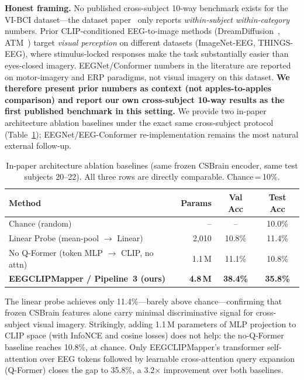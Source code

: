 \documentclass{article}
\begin{document}
\textbf{Honest framing.} No published cross-subject 10-way benchmark exists for the VI-BCI dataset---the dataset paper~\citep{figshare_paper} only reports \emph{within-subject within-category} numbers. Prior CLIP-conditioned EEG-to-image methods (DreamDiffusion~\citep{bai2023dreamdiffusion}, ATM~\citep{li2024atm}) target \emph{visual perception} on different datasets (ImageNet-EEG, THINGS-EEG), where stimulus-locked responses make the task substantially easier than eyes-closed imagery. EEGNet/Conformer numbers in the literature are reported on motor-imagery and ERP paradigms, not visual imagery on this dataset. \textbf{We therefore present prior numbers as context (not apples-to-apples comparison) and report our own cross-subject 10-way results as the first published benchmark in this setting.} We provide two in-paper architecture ablation baselines under the exact same cross-subject protocol (Table~\ref{tab:ablation}); EEGNet/EEG-Conformer re-implementation remains the most natural external follow-up.

\begin{table}[h]
  \centering
  \caption{In-paper architecture ablation baselines (same frozen CSBrain encoder, same test subjects 20--22). All three rows are directly comparable. Chance\,=\,10\%.}
  \label{tab:ablation}
  \small
  \setlength{\tabcolsep}{5pt}
  \begin{tabular}{lrcc}
    \toprule
    \textbf{Method} & \textbf{Params} & \textbf{Val Acc} & \textbf{Test Acc} \\
    \midrule
    Chance (random)                             & --       & --      & 10.0\% \\
    Linear Probe (mean-pool $\to$ Linear)       & 2{,}010  & 10.8\%  & 11.4\% \\
    No Q-Former (token MLP $\to$ CLIP, no attn) & 1.1\,M   & 11.1\%  & 10.8\% \\
    \textbf{EEGCLIPMapper / Pipeline~3 (ours)}  & \textbf{4.8\,M} & \textbf{38.4\%} & \textbf{35.8\%} \\
    \bottomrule
  \end{tabular}
\end{table}

The linear probe achieves only 11.4\%---barely above chance---confirming that frozen CSBrain features alone carry minimal discriminative signal for cross-subject visual imagery. Strikingly, adding 1.1\,M parameters of MLP projection to CLIP space (with InfoNCE and cosine losses) does not help: the no-Q-Former baseline reaches 10.8\%, at chance. Only EEGCLIPMapper's transformer self-attention over EEG tokens followed by learnable cross-attention query expansion (Q-Former) closes the gap to 35.8\%, a 3.2$\times$ improvement over both baselines.
\end{document}
